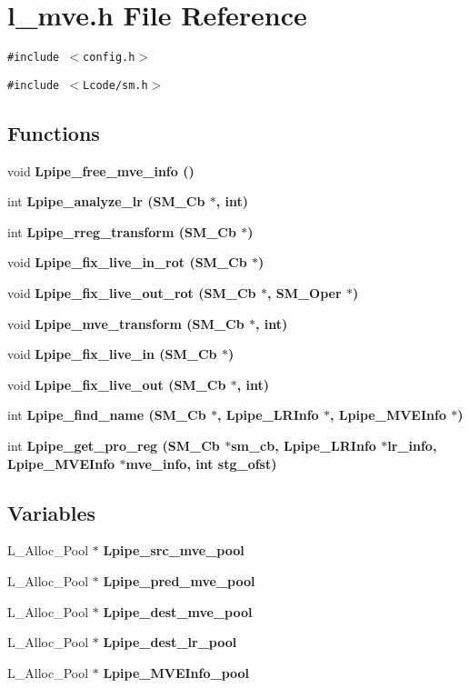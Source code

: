 \section{l\_\-mve.h File Reference}
\label{l__mve_8h}
{\tt \#include $<$config.h$>$}\par
{\tt \#include $<$Lcode/sm.h$>$}\par
\subsection*{Functions}
\begin{CompactItemize}
\item 
void \bf{Lpipe\_\-free\_\-mve\_\-info} ()
\item 
int \bf{Lpipe\_\-analyze\_\-lr} (\bf{SM\_\-Cb} $\ast$, int)
\item 
int \bf{Lpipe\_\-rreg\_\-transform} (\bf{SM\_\-Cb} $\ast$)
\item 
void \bf{Lpipe\_\-fix\_\-live\_\-in\_\-rot} (\bf{SM\_\-Cb} $\ast$)
\item 
void \bf{Lpipe\_\-fix\_\-live\_\-out\_\-rot} (\bf{SM\_\-Cb} $\ast$, \bf{SM\_\-Oper} $\ast$)
\item 
void \bf{Lpipe\_\-mve\_\-transform} (\bf{SM\_\-Cb} $\ast$, int)
\item 
void \bf{Lpipe\_\-fix\_\-live\_\-in} (\bf{SM\_\-Cb} $\ast$)
\item 
void \bf{Lpipe\_\-fix\_\-live\_\-out} (\bf{SM\_\-Cb} $\ast$, int)
\item 
int \bf{Lpipe\_\-find\_\-name} (\bf{SM\_\-Cb} $\ast$, \bf{Lpipe\_\-LRInfo} $\ast$, \bf{Lpipe\_\-MVEInfo} $\ast$)
\item 
int \bf{Lpipe\_\-get\_\-pro\_\-reg} (\bf{SM\_\-Cb} $\ast$sm\_\-cb, \bf{Lpipe\_\-LRInfo} $\ast$lr\_\-info, \bf{Lpipe\_\-MVEInfo} $\ast$mve\_\-info, int stg\_\-ofst)
\end{CompactItemize}
\subsection*{Variables}
\begin{CompactItemize}
\item 
L\_\-Alloc\_\-Pool $\ast$ \bf{Lpipe\_\-src\_\-mve\_\-pool}
\item 
L\_\-Alloc\_\-Pool $\ast$ \bf{Lpipe\_\-pred\_\-mve\_\-pool}
\item 
L\_\-Alloc\_\-Pool $\ast$ \bf{Lpipe\_\-dest\_\-mve\_\-pool}
\item 
L\_\-Alloc\_\-Pool $\ast$ \bf{Lpipe\_\-dest\_\-lr\_\-pool}
\item 
L\_\-Alloc\_\-Pool $\ast$ \bf{Lpipe\_\-MVEInfo\_\-pool}
\end{CompactItemize}


